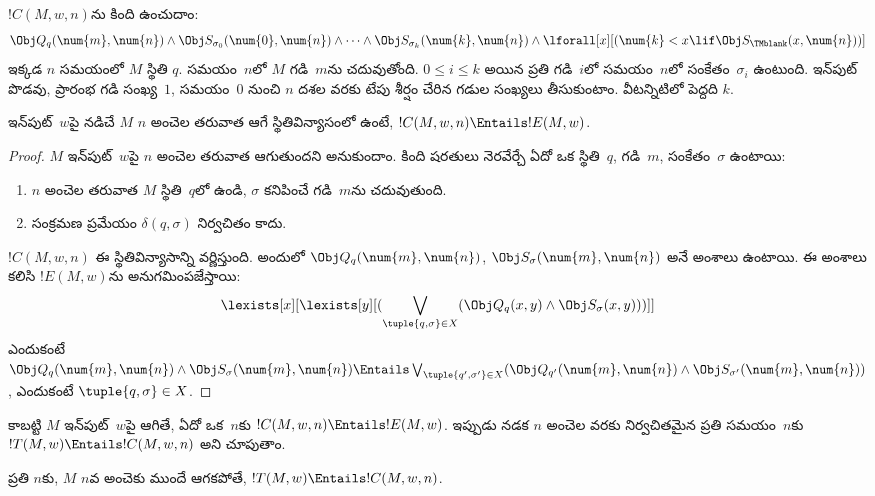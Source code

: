 \documentclass[../../../include/open-logic-section]{subfiles}
\begin{document}
\begin{defn}
$!C(M, w, n)$ను కింది  ఉంచుదాం:
\[
\Obj Q_q(\num{m}, \num{n}) \land \Obj S_{\sigma_0}(\num{0}, \num{n})
\land \dots \land \Obj S_{\sigma_k}(\num{k}, \num{n}) \land
\lforall[x][(\num{k} < x \lif \Obj S_\TMblank(x, \num{n}))]
\]
ఇక్కడ $n$ సమయంలో $M$ స్థితి $q$. సమయం~$n$లో $M$ గడి~$m$ను చదువుతోంది.
$0 \le i \le k$ అయిన ప్రతి గడి~$i$లో సమయం~$n$లో సంకేతం~$\sigma_i$ ఉంటుంది.
ఇన్‌పుట్ పొడవు, ప్రారంభ గడి సంఖ్య~$1$, సమయం~$0$ నుంచి $n$ దశల వరకు
టేపు శీర్షం చేరిన గడుల సంఖ్యలు తీసుకుంటాం. వీటన్నిటిలో పెద్దది $k$.
\end{defn}

\begin{lem}
ఇన్‌పుట్~$w$పై నడిచే $M$ $n$ అంచెల తరువాత ఆగే స్థితివిన్యాసంలో ఉంటే,
$!C(M, w, n) \Entails !E(M, w)$.
\end{lem}

\begin{proof}
$M$ ఇన్‌పుట్~$w$పై $n$ అంచెల తరువాత ఆగుతుందని అనుకుందాం. కింది షరతులు
నెరవేర్చే ఏదో ఒక స్థితి~$q$, గడి~$m$, సంకేతం~$\sigma$ ఉంటాయి:
\begin{enumerate}
\item $n$ అంచెల తరువాత $M$ స్థితి~$q$లో ఉండి, $\sigma$ కనిపించే గడి~$m$ను
  చదువుతుంది.
\item సంక్రమణ ప్రమేయం $\delta(q, \sigma)$ నిర్వచితం కాదు.
\end{enumerate}
$!C(M, w, n)$ ఈ స్థితివిన్యాసాన్ని వర్ణిస్తుంది. అందులో
$\Obj Q_{q}(\num{m}, \num{n})$, $\Obj S_{\sigma}(\num{m}, \num{n})$ అనే
అంశాలు ఉంటాయి. ఈ అంశాలు కలిసి $!E(M,w)$ను అనుగమింపజేస్తాయి:
\[
\lexists[x][\lexists[y][(\bigvee_{\tuple{q, \sigma} \in
      X}(\Obj Q_q(x, y) \land \Obj S_\sigma(x, y)))]]
\]
ఎందుకంటే
$\Obj Q_q(\num{m}, \num{n}) \land \Obj S_\sigma(\num{m}, \num{n})
\Entails \bigvee_{\tuple{q', \sigma'} \in X}
(\Obj Q_{q'}(\num{m}, \num{n}) \land
\Obj S_{\sigma'}(\num{m}, \num{n}))$, ఎందుకంటే
$\tuple{q,\sigma} \in X$.
\end{proof}

\begin{explain}
కాబట్టి $M$ ఇన్‌పుట్~$w$పై ఆగితే, ఏదో ఒక~$n$కు
$!C(M,w,n) \Entails !E(M,w)$. ఇప్పుడు నడక $n$ అంచెల వరకు నిర్వచితమైన ప్రతి
సమయం~$n$కు $!T(M,w) \Entails !C(M,w,n)$ అని చూపుతాం.
\end{explain}

\begin{lem}
ప్రతి $n$కు, $M$ $n$వ అంచెకు ముందే ఆగకపోతే,
$!T(M, w) \Entails !C(M, w, n)$.
\end{lem}
\end{document}
